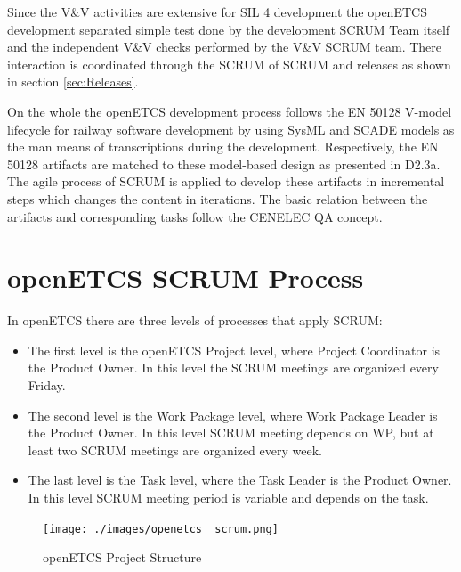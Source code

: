 Since the V\&V activities are extensive for SIL 4 development the openETCS development separated simple test done by the development SCRUM Team itself and the independent V\&V checks performed by the V\&V SCRUM team. There interaction is coordinated through the SCRUM of SCRUM and releases as shown in section \ref{sec:Releases}.

On the whole the openETCS development process follows the EN 50128 V-model lifecycle for railway software development by using SysML and SCADE models as the man means of transcriptions during the development. Respectively, the EN 50128 artifacts are matched to these model-based design as presented in D2.3a. The agile process of SCRUM is applied to  develop these artifacts in incremental steps which changes the content in iterations. The basic relation between the artifacts and corresponding tasks follow the CENELEC QA concept.


\chapter{openETCS SCRUM Process}
\label{sec:ScrumProzess}

In openETCS there are three levels of processes that apply SCRUM:
\begin{itemize}
	\item The first level is the openETCS Project level, where Project Coordinator is the Product Owner. In this level the SCRUM meetings are organized every Friday.
	\item The second level is the Work Package level, where Work Package Leader is the Product Owner. In this level SCRUM meeting depends on WP, but at least two SCRUM meetings are organized every week.
	\item The last level is the Task level, where the Task Leader is the Product Owner. In this level SCRUM meeting period is variable and depends on the task.
\end{itemize}

\begin{figure}[h]
	\centering
	\texttt{[image: ./images/openetcs\_\_scrum.png]}
	\caption{openETCS Project Structure}
\end{figure}

